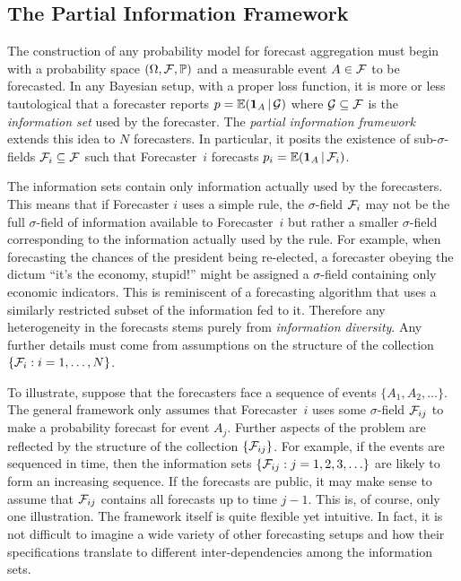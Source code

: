 \documentclass[11pt]{article}
\renewcommand{\P}{\mathbb{P}}
\newcommand{\E}{\mathbb{E}}
\theoremstyle{definition}
\theoremstyle{definition}
\def\one{{\bf 1}}
\def\F{{\cal F}}
\def\G{{\cal G}}
\def\P{{\mathbb P}}
\def\E{{\mathbb E}}
\def\|{\, | \,}
\begin{document}
\subsection{The Partial Information Framework}
\label{PIFintro}
The construction of any probability model for forecast aggregation
must begin with a probability space $(\Omega, \F , \P)$ and a
measurable event $A \in \F$ to be forecasted.  In any Bayesian setup,
with a proper loss function, it is more or less tautological that a
forecaster reports $p = \E (\one_A \| \G)$ where $\G \subseteq \F$ is
the \textit{information set} used by the forecaster.  The
\textit{partial information framework} extends this idea to $N$
forecasters. In particular, it posits the existence of
sub-$\sigma$-fields $\F_i \subseteq \F$ such that Forecaster~$i$
forecasts $p_i = \E (\one_A \| \F_i)$.

The information sets contain only information actually used by the
forecasters. This means that if Forecaster $i$ uses a simple rule, the
$\sigma$-field $\F_i$ may not be the full $\sigma$-field of
information available to Forecaster~$i$ but rather a smaller
$\sigma$-field corresponding to the information actually used by the
rule.  For example, when forecasting the chances of the president
being re-elected, a forecaster obeying the dictum ``it's the economy,
stupid!''  might be assigned a $\sigma$-field containing only economic
indicators.  This is reminiscent of a forecasting algorithm that uses
a similarly restricted subset of the information fed to it. Therefore
any heterogeneity in the forecasts stems purely from
\textit{information diversity}.  Any further details must come from
assumptions on the structure of the collection $\{ \F_i : i = 1,
\dots, N\}$.  %

To illustrate, suppose that the forecasters face a sequence of events
$\{ A_1, A_2 , \ldots \}$. The general framework only assumes that
Forecaster~$i$ uses some $\sigma$-field $\F_{ij}$ to make a
probability forecast for event $A_j$.  Further aspects of the problem
are reflected by the structure of the collection $\{ \F_{ij} \}$.  For
example, if the events are sequenced in time, then the information
sets $\{ \F_{ij} : j = 1 , 2, 3, \ldots \}$ are likely to form an
increasing sequence.  If the forecasts are public, it may make sense
to assume that $\F_{ij}$ contains all forecasts up to time $j-1$.
This is, of course, only one illustration. The framework itself is quite flexible
yet intuitive. In fact, it is not difficult to imagine a wide variety
of other forecasting setups and how their specifications translate to
different inter-dependencies among the information sets.
\end{document}
